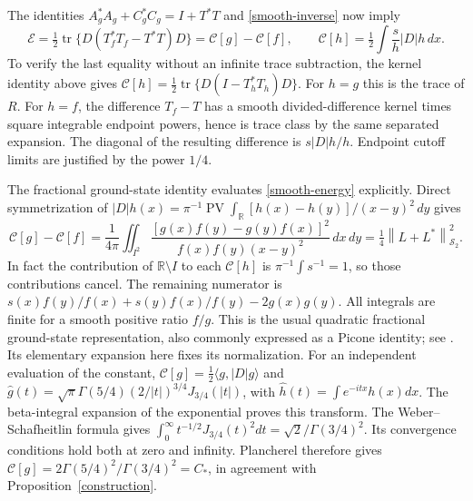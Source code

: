 \documentclass[a4paper,11pt]{amsart}
\theoremstyle{remark}\newtheorem{remark}[theorem]{Remark}
\newcommand{\tr}{\operatorname{tr}}
\newcommand{\PV}{\operatorname{PV}}
\newcommand{\HS}{\mathcal S_2}
\newcommand{\R}{\mathbb R}
\newcommand{\dd}{\,d}
\newcommand{\norm}[1]{\left\lVert#1\right\rVert}
\newcommand{\Cstar}{C_*}
\begin{document}
The identities
$A_g^*A_g+C_g^*C_g=I+T^*T$ and \eqref{smooth-inverse} now imply
\begin{equation}\label{smooth-energy}
 \mathcal E=\tfrac12\tr\{D(T_f^*T_f-T^*T)D\}
 =\mathcal C[g]-\mathcal C[f],\qquad
 \mathcal C[h]=\tfrac12\int\frac{s}{h}|D|h\dd x.
\end{equation}
To verify the last equality without an infinite trace subtraction,
the kernel identity above gives
$\mathcal C[h]=\tfrac12\tr\{D(I-T_h^*T_h)D\}$.
For $h=g$ this is the trace of $R$. For $h=f$, the difference
$T_f-T$ has a smooth divided-difference kernel times square
integrable endpoint powers, hence is trace class by the same
separated expansion. The diagonal of the resulting difference is
$s|D|h/h$. Endpoint cutoff limits are justified by the power $1/4$.

The fractional ground-state identity evaluates \eqref{smooth-energy}
explicitly. Direct symmetrization of
$|D|h(x)=\pi^{-1}\PV\int_{\R}[h(x)-h(y)]/(x-y)^2\dd y$ gives
\begin{equation}\label{ground-state}
 \mathcal C[g]-\mathcal C[f]
 =\frac1{4\pi}\iint_{I^2}
 \frac{[g(x)f(y)-g(y)f(x)]^2}{f(x)f(y)(x-y)^2}\dd x\dd y
 =\tfrac14\norm{L+L^*}_{\HS}^2.
\end{equation}
In fact the contribution of $\R\setminus I$ to each $\mathcal C[h]$
is $\pi^{-1}\int s^{-1}=1$, so those contributions cancel.
The remaining numerator is
$s(x)f(y)/f(x)+s(y)f(x)/f(y)-2g(x)g(y)$.
All integrals are finite for a smooth positive ratio $f/g$.
This is the usual quadratic fractional ground-state representation,
also commonly expressed as a Picone identity; see \cite{frank}.
Its elementary expansion here fixes its normalization.
For an independent evaluation of the constant,
$\mathcal C[g]=\tfrac12\langle g,|D|g\rangle$ and
$\widehat g(t)=\sqrt\pi\Gamma(5/4)(2/|t|)^{3/4}J_{3/4}(|t|)$,
with $\widehat h(t)=\int e^{-itx}h(x)dx$.
The beta-integral expansion of the exponential proves this transform.
The Weber--Schafheitlin formula \cite[10.22.57]{dlmf} gives
$\int_0^\infty t^{-1/2}J_{3/4}(t)^2dt
 =\sqrt2/\Gamma(3/4)^2$.
Its convergence conditions hold both at zero and infinity.
Plancherel therefore gives
$\mathcal C[g]=2\Gamma(5/4)^2/\Gamma(3/4)^2=\Cstar$,
in agreement with Proposition~\ref{construction}.
\end{document}
